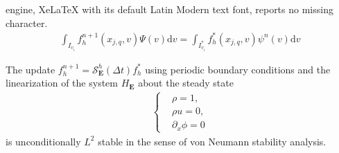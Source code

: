 \documentclass[10pt,a4paper]{amsart}
\begin{document}
engine, XeLaTeX with its default Latin Modern text font, reports no missing character.
\begin{align}\label{HhE}
    \int_{I_{v_i}} f_h^{n+1}(x_{j,q},v) \Psi(v)\mathrm d v=\int_{I_{v_i}^*} f_h^{*}(x_{j,q},v) \psi^n(v)\mathrm d v
\end{align}

\begin{theorem}
 The update $f_h^{n+1}=\mathcal{S}_{\mathbf{E}}^h(\Delta t)f_h^*$ using
 periodic boundary conditions and the linearization
 of the system $H_{\mathbf E}$ about the steady state
\begin{align*}
    \left\{
        \begin{aligned}
            &\rho=1,\\
            &\rho u=0,\\
            &\partial_x\phi=0
        \end{aligned}
    \right.
\end{align*}
is unconditionally $L^2$ stable in the sense of von Neumann stability analysis.
\end{theorem}
\end{document}
